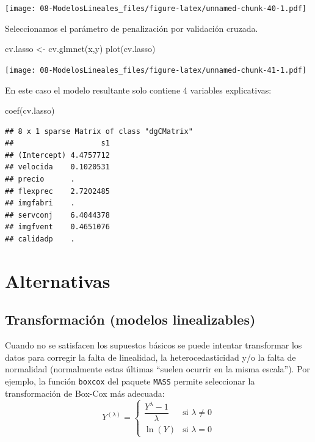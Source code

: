 \documentclass[
]{book}
\newenvironment{Shaded}{\begin{snugshade}}{\end{snugshade}}
\newcommand{\FunctionTok}[1]{\textcolor[rgb]{0.00,0.00,0.00}{#1}}
\newcommand{\NormalTok}[1]{#1}
\newcommand{\OtherTok}[1]{\textcolor[rgb]{0.56,0.35,0.01}{#1}}
\theoremstyle{break}
\theoremstyle{nonumberplain}
\begin{document}
\texttt{[image: 08-ModelosLineales\_files/figure-latex/unnamed-chunk-40-1.pdf]}

Seleccionamos el parámetro de penalización por validación cruzada.

\begin{Shaded}
\begin{Highlighting}[]
\NormalTok{cv.lasso }\OtherTok{\textless{}{-}} \FunctionTok{cv.glmnet}\NormalTok{(x,y)}
\FunctionTok{plot}\NormalTok{(cv.lasso)}
\end{Highlighting}
\end{Shaded}

\texttt{[image: 08-ModelosLineales\_files/figure-latex/unnamed-chunk-41-1.pdf]}

En este caso el modelo resultante solo contiene 4 variables explicativas:

\begin{Shaded}
\begin{Highlighting}[]
\FunctionTok{coef}\NormalTok{(cv.lasso)}
\end{Highlighting}
\end{Shaded}

\begin{verbatim}
## 8 x 1 sparse Matrix of class "dgCMatrix"
##                    s1
## (Intercept) 4.4757712
## velocida    0.1020531
## precio      .        
## flexprec    2.7202485
## imgfabri    .        
## servconj    6.4044378
## imgfvent    0.4651076
## calidadp    .
\end{verbatim}

\hypertarget{alternativas}{%
\section{Alternativas}\label{alternativas}}

\hypertarget{transformaciuxf3n-modelos-linealizables}{%
\subsection{Transformación (modelos linealizables)}\label{transformaciuxf3n-modelos-linealizables}}

Cuando no se satisfacen los supuestos básicos se puede intentar
transformar los datos para corregir la falta de
linealidad, la heterocedasticidad y/o la falta de normalidad
(normalmente estas últimas ``suelen ocurrir en la misma escala'').
Por ejemplo, la función \texttt{boxcox} del paquete \texttt{MASS} permite seleccionar la transformación de Box-Cox
más adecuada:
\[Y^{(\lambda)} =
\begin{cases}
\dfrac{Y^\lambda - 1}{\lambda} & \text{si } \lambda \neq 0 \\
\ln{(Y)} & \text{si } \lambda = 0
\end{cases}\]
\end{document}
